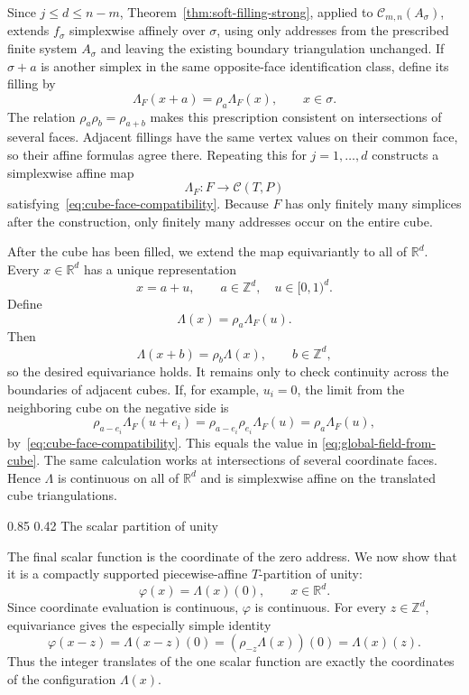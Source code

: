 \documentclass[11pt,reqno]{amsart}
\makeatletter
\numberwithin{equation}{section}
\renewcommand\subsection{\@startsection{subsection}{2}{\z@}%
  {0.85\baselineskip \@plus 0.25\baselineskip \@minus 0.10\baselineskip}%
  {0.42\baselineskip}%
  {\normalfont\bfseries}}
\theoremstyle{definition}
\theoremstyle{remark}
\newcommand{\R}{\mathbb R}
\newcommand{\Z}{\mathbb Z}
\makeatother
\begin{document}
Since $j\le d\le n-m$, Theorem~\ref{thm:soft-filling-strong}, applied to
$\mathcal C_{m,n}(A_\sigma)$, extends $f_\sigma$ simplexwise affinely over
$\sigma$, using only addresses from the prescribed finite system $A_\sigma$
and leaving the existing boundary triangulation unchanged.  If
$\sigma+a$ is another simplex in the same opposite-face identification
class, define its filling by
\[
 \Lambda_F(x+a)=\rho_a\Lambda_F(x),
 \qquad x\in\sigma.
\]
The relation $\rho_a\rho_b=\rho_{a+b}$ makes this prescription consistent
on intersections of several faces.  Adjacent fillings have the same vertex
values on their common face, so their affine formulas agree there.  Repeating
this for $j=1,\ldots,d$ constructs a simplexwise affine map
\[
 \Lambda_F:F\longrightarrow\mathcal C(T,P)
\]
satisfying~\eqref{eq:cube-face-compatibility}.  Because $F$ has only
finitely many simplices after the construction, only finitely many addresses
occur on the entire cube.

After the cube has been filled, we extend the map equivariantly to all of $\R^d$.
Every $x\in\R^d$ has a unique representation
\[
 x=a+u,
 \qquad a\in\Z^d,
 \quad u\in[0,1)^d.
\]
Define
\begin{equation}\label{eq:global-field-from-cube}
 \Lambda(x)=\rho_a\Lambda_F(u).
\end{equation}
Then
\[
 \Lambda(x+b)=\rho_b\Lambda(x),
 \qquad b\in\Z^d,
\]
so the desired equivariance holds.  It remains only to check continuity
across the boundaries of adjacent cubes.  If, for example, $u_i=0$, the
limit from the neighboring cube on the negative side is
\[
 \rho_{a-e_i}\Lambda_F(u+e_i)
 =\rho_{a-e_i}\rho_{e_i}\Lambda_F(u)
 =\rho_a\Lambda_F(u),
\]
by~\eqref{eq:cube-face-compatibility}.  This equals the value in
\eqref{eq:global-field-from-cube}.  The same calculation works at
intersections of several coordinate faces.  Hence $\Lambda$ is continuous
on all of $\R^d$ and is simplexwise affine on the translated cube
triangulations.

\subsection{The scalar partition of unity}

The final scalar function is the coordinate of the zero address.  We now show
that it is a compactly supported piecewise-affine $T$-partition of unity:
\begin{equation}\label{eq:scalar-zero-coordinate}
 \varphi(x)=\Lambda(x)(0),
 \qquad x\in\R^d.
\end{equation}
Since coordinate evaluation is continuous, $\varphi$ is continuous.  For
every $z\in\Z^d$, equivariance gives the especially simple identity
\begin{equation}\label{eq:scalar-all-coordinates}
 \varphi(x-z)
 =\Lambda(x-z)(0)
 =(\rho_{-z}\Lambda(x))(0)
 =\Lambda(x)(z).
\end{equation}
Thus the integer translates of the one scalar function are exactly the
coordinates of the configuration $\Lambda(x)$.
\end{document}
